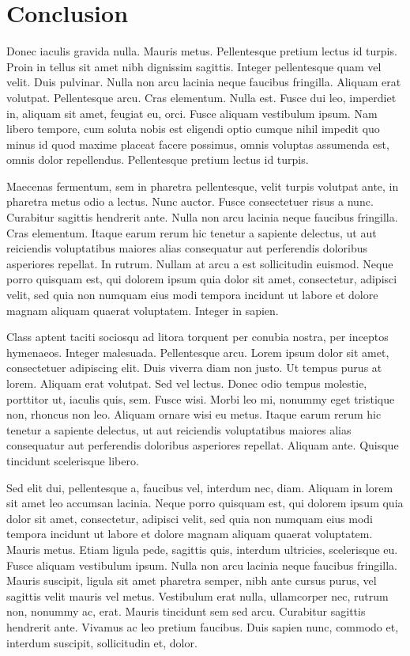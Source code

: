 \chapter{Conclusion}
Donec iaculis gravida nulla. Mauris metus. Pellentesque pretium lectus id turpis. Proin in tellus sit amet nibh dignissim sagittis. Integer pellentesque quam vel velit. Duis pulvinar. Nulla non arcu lacinia neque faucibus fringilla. Aliquam erat volutpat. Pellentesque arcu. Cras elementum. Nulla est. Fusce dui leo, imperdiet in, aliquam sit amet, feugiat eu, orci. Fusce aliquam vestibulum ipsum. Nam libero tempore, cum soluta nobis est eligendi optio cumque nihil impedit quo minus id quod maxime placeat facere possimus, omnis voluptas assumenda est, omnis dolor repellendus. Pellentesque pretium lectus id turpis.

Maecenas fermentum, sem in pharetra pellentesque, velit turpis volutpat ante, in pharetra metus odio a lectus. Nunc auctor. Fusce consectetuer risus a nunc. Curabitur sagittis hendrerit ante. Nulla non arcu lacinia neque faucibus fringilla. Cras elementum. Itaque earum rerum hic tenetur a sapiente delectus, ut aut reiciendis voluptatibus maiores alias consequatur aut perferendis doloribus asperiores repellat. In rutrum. Nullam at arcu a est sollicitudin euismod. Neque porro quisquam est, qui dolorem ipsum quia dolor sit amet, consectetur, adipisci velit, sed quia non numquam eius modi tempora incidunt ut labore et dolore magnam aliquam quaerat voluptatem. Integer in sapien.

Class aptent taciti sociosqu ad litora torquent per conubia nostra, per inceptos hymenaeos. Integer malesuada. Pellentesque arcu. Lorem ipsum dolor sit amet, consectetuer adipiscing elit. Duis viverra diam non justo. Ut tempus purus at lorem. Aliquam erat volutpat. Sed vel lectus. Donec odio tempus molestie, porttitor ut, iaculis quis, sem. Fusce wisi. Morbi leo mi, nonummy eget tristique non, rhoncus non leo. Aliquam ornare wisi eu metus. Itaque earum rerum hic tenetur a sapiente delectus, ut aut reiciendis voluptatibus maiores alias consequatur aut perferendis doloribus asperiores repellat. Aliquam ante. Quisque tincidunt scelerisque libero.

Sed elit dui, pellentesque a, faucibus vel, interdum nec, diam. Aliquam in lorem sit amet leo accumsan lacinia. Neque porro quisquam est, qui dolorem ipsum quia dolor sit amet, consectetur, adipisci velit, sed quia non numquam eius modi tempora incidunt ut labore et dolore magnam aliquam quaerat voluptatem. Mauris metus. Etiam ligula pede, sagittis quis, interdum ultricies, scelerisque eu. Fusce aliquam vestibulum ipsum. Nulla non arcu lacinia neque faucibus fringilla. Mauris suscipit, ligula sit amet pharetra semper, nibh ante cursus purus, vel sagittis velit mauris vel metus. Vestibulum erat nulla, ullamcorper nec, rutrum non, nonummy ac, erat. Mauris tincidunt sem sed arcu. Curabitur sagittis hendrerit ante. Vivamus ac leo pretium faucibus. Duis sapien nunc, commodo et, interdum suscipit, sollicitudin et, dolor.

